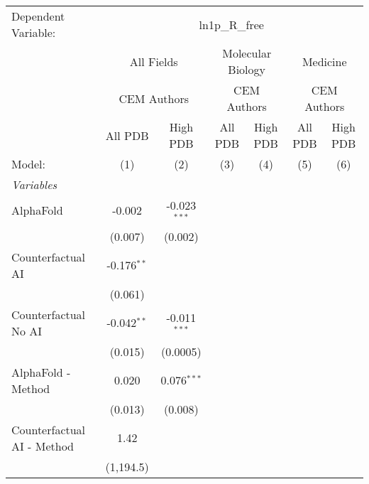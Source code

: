 \begingroup
\centering
\begin{tabular}{lcccccc}
   \tabularnewline \midrule \midrule
   Dependent Variable: & \multicolumn{6}{c}{ln1p\_R\_free}\\
 & \multicolumn{2}{c}{All Fields} & \multicolumn{2}{c}{Molecular Biology} & \multicolumn{2}{c}{Medicine} \\
\cmidrule(lr){2-3} \cmidrule(lr){4-5} \cmidrule(lr){6-7}
 & \multicolumn{2}{c}{CEM Authors} & \multicolumn{2}{c}{CEM Authors} & \multicolumn{2}{c}{CEM Authors} \\
\cmidrule(lr){2-3} \cmidrule(lr){4-5} \cmidrule(lr){6-7}
 & \multicolumn{1}{c}{All PDB} & \multicolumn{1}{c}{High PDB} & \multicolumn{1}{c}{All PDB} & \multicolumn{1}{c}{High PDB} & \multicolumn{1}{c}{All PDB} & \multicolumn{1}{c}{High PDB} \\
\cmidrule(lr){2-2} \cmidrule(lr){3-3} \cmidrule(lr){4-4} \cmidrule(lr){5-5} \cmidrule(lr){6-6} \cmidrule(lr){7-7}
   Model:                                   & (1)           & (2)            & (3) & (4) & (5) & (6)\\  
   \midrule
   \emph{Variables}\\
   AlphaFold                                & -0.002        & -0.023$^{***}$ &     &     &     &   \\   
                                            & (0.007)       & (0.002)        &     &     &     &   \\   
   Counterfactual AI                        & -0.176$^{**}$ &                &     &     &     &   \\   
                                            & (0.061)       &                &     &     &     &   \\   
   Counterfactual No AI                     & -0.042$^{**}$ & -0.011$^{***}$ &     &     &     &   \\   
                                            & (0.015)       & (0.0005)       &     &     &     &   \\   
   AlphaFold - Method                       & 0.020         & 0.076$^{***}$  &     &     &     &   \\   
                                            & (0.013)       & (0.008)        &     &     &     &   \\   
   Counterfactual AI - Method               & 1.42          &                &     &     &     &   \\   
                                            & (1,194.5)     &                &     &     &     &   \\   

\end{tabular}
